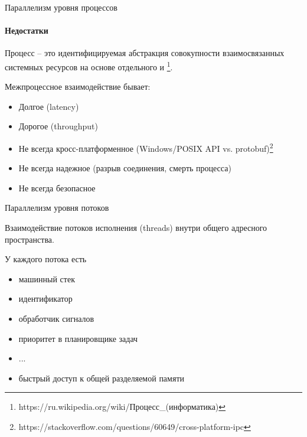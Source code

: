 \begin{frame}{Параллелизм уровня процессов}
\framesubtitle{Недостатки}
Процесс -- это идентифицируемая абстракция совокупности взаимосвязанных системных ресурсов на основе отдельного и {}\footnote{\tiny{https://ru.wikipedia.org/wiki/Процесс\_(информатика)}}.

\pause

Межпроцессное взаимодействие бывает: %
\begin{itemize}
  \pause
  \item Долгое (latency)

  \pause
  \item Дорогое (throughput)

  \pause
  \item Не всегда кросс-платформенное (Windows/POSIX API vs. protobuf)\footnote<5->{\tiny{https://stackoverflow.com/questions/60649/cross-platform-ipc}}

  \pause
  \item Не всегда надежное (разрыв соединения, смерть процесса)

  \pause
  \item Не всегда безопасное
\end{itemize}

\pause

\end{frame}


\begin{frame}{Параллелизм уровня потоков}

Взаимодействие потоков исполнения (threads) внутри общего адресного пространства.

\pause
У каждого потока есть

\begin{itemize}
    \item машинный стек
    \item идентификатор
    \item обработчик сигналов
    \item приоритет в планировщике задач
    \item ...
    \pause
    \item быстрый доступ к общей разделяемой памяти
\end{itemize}

\end{frame}


